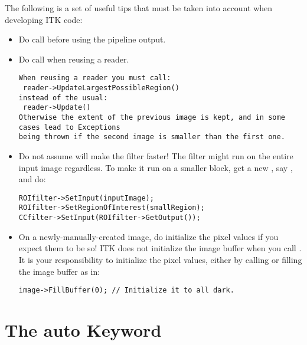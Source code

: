 The following is a set of useful tips that must be taken into account when
developing ITK code:
\begin{itemize}
\item Do call  before using the pipeline output.
\item Do call  when reusing a reader.

\small
\begin{verbatim}
When reusing a reader you must call:
 reader->UpdateLargestPossibleRegion()
instead of the usual:
 reader->Update()
Otherwise the extent of the previous image is kept, and in some cases lead to Exceptions
being thrown if the second image is smaller than the first one.
\end{verbatim}
\normalsize

\item Do not assume  will
make the filter faster! The filter might run on the entire input image
regardless. To make it run on a smaller block, get a new
, say , and do:

\small
\begin{verbatim}
ROIfilter->SetInput(inputImage);
ROIfilter->SetRegionOfInterest(smallRegion);
CCfilter->SetInput(ROIfilter->GetOutput());
\end{verbatim}
\normalsize

\item On a newly-manually-created image, do initialize the pixel values if you
expect them to be so! ITK does not initialize the image buffer when you call
. It is your responsibility to initialize the pixel values,
either by calling  or filling the image buffer as in:

\small
\begin{verbatim}
image->FillBuffer(0); // Initialize it to all dark.
\end{verbatim}
\normalsize

\end{itemize}

\section{The auto Keyword}
\label{sec:TheAutoKeyword}

